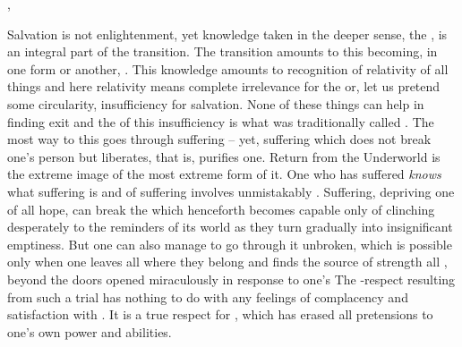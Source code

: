 \sep

\pa Salvation is not enlightenment, yet knowledge taken in the deeper sense, the
, is an integral part of the transition. The
transition amounts to this  becoming, in one form or
another, . This knowledge amounts to recognition of
relativity of all  things and here relativity means complete
irrelevance for the  or, let us pretend some circularity,
insufficiency for 
salvation. None of these things can help in finding exit and the 
of this insufficiency is what was traditionally called . The most
 way to this 
 goes through suffering -- yet,  
suffering which does not break one's person but liberates, that is, purifies one.
Return from the Underworld is the extreme image of the most extreme form of it.
One who has suffered {\em knows} what suffering is and  of suffering
involves unmistakably .
Suffering, depriving one of all  hope, can break the  which
henceforth becomes capable only of clinching desperately to the reminders 
of its  world as they turn gradually into insignificant emptiness.
But one can also manage to go through it unbroken, 
which is possible only when one leaves all  where they belong and
finds the source of strength  all , beyond the
doors opened miraculously in response to one's  The
-respect resulting from such a trial has nothing to do with any
feelings of complacency and satisfaction with . It is a true respect
for , which has erased all pretensions to one's own power and
abilities. 

